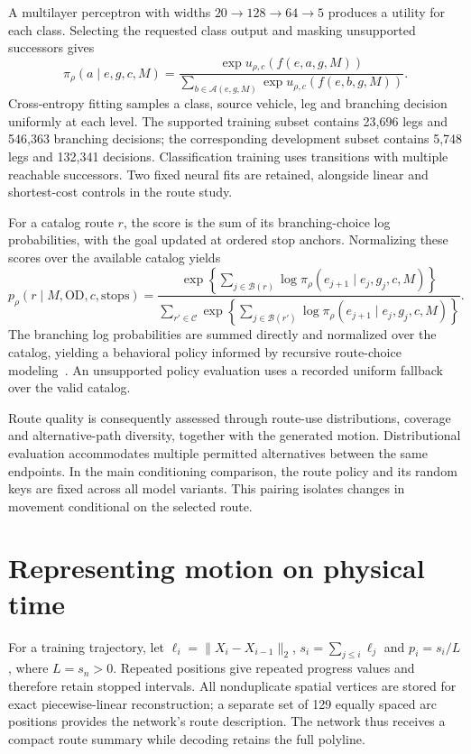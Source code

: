 A multilayer perceptron with widths $20\rightarrow128\rightarrow64\rightarrow5$ produces a utility for each class. Selecting the requested class output and masking unsupported successors gives
\begin{equation}
 \pi_\rho(a\mid e,g,c,M)=
 \frac{\exp u_{\rho,c}(f(e,a,g,M))}
 {\sum_{b\in\mathcal A(e,g,M)}\exp u_{\rho,c}(f(e,b,g,M))}.
 \label{eq:route-policy}
\end{equation}
Cross-entropy fitting samples a class, source vehicle, leg and branching decision uniformly at each level. The supported training subset contains 23,696 legs and 546,363 branching decisions; the corresponding development subset contains 5,748 legs and 132,341 decisions. Classification training uses transitions with multiple reachable successors. Two fixed neural fits are retained, alongside linear and shortest-cost controls in the route study.

For a catalog route $r$, the score is the sum of its branching-choice log probabilities, with the goal updated at ordered stop anchors. Normalizing these scores over the available catalog yields
\begin{equation}
 p_\rho(r\mid M,\mathrm{OD},c,\mathrm{stops})=
 \frac{\exp\!\left\{\sum_{j\in\mathcal B(r)}
 \log\pi_\rho(e_{j+1}\mid e_j,g_j,c,M)\right\}}
 {\sum_{r'\in\mathcal C}\exp\!\left\{\sum_{j\in\mathcal B(r')}
 \log\pi_\rho(e_{j+1}\mid e_j,g_j,c,M)\right\}}.
 \label{eq:route-catalog}
\end{equation}
The branching log probabilities are summed directly and normalized over the catalog, yielding a behavioral policy informed by recursive route-choice modeling~\cite{routechoice}. An unsupported policy evaluation uses a recorded uniform fallback over the valid catalog.

Route quality is consequently assessed through route-use distributions, coverage and alternative-path diversity, together with the generated motion. Distributional evaluation accommodates multiple permitted alternatives between the same endpoints. In the main conditioning comparison, the route policy and its random keys are fixed across all model variants. This pairing isolates changes in movement conditional on the selected route.

\section{Representing motion on physical time}
For a training trajectory, let $\ell_i=\|X_i-X_{i-1}\|_2$, $s_i=\sum_{j\leq i}\ell_j$ and $p_i=s_i/L$, where $L=s_n>0$. Repeated positions give repeated progress values and therefore retain stopped intervals. All nonduplicate spatial vertices are stored for exact piecewise-linear reconstruction; a separate set of 129 equally spaced arc positions provides the network's route description. The network thus receives a compact route summary while decoding retains the full polyline.

